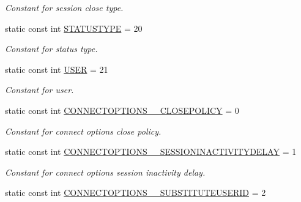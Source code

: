 \begin{DoxyCompactItemize}
\begin{DoxyCompactList}\small\item\em Constant for session close type. \item\end{DoxyCompactList}\item 
\hypertarget{classUMS__Data_1_1UMS__DataPackage_a10e223a94d2f042df21c196f8d7fbebd}{
static const int \hyperlink{classUMS__Data_1_1UMS__DataPackage_a10e223a94d2f042df21c196f8d7fbebd}{STATUSTYPE} = 20}
\label{classUMS__Data_1_1UMS__DataPackage_a10e223a94d2f042df21c196f8d7fbebd}

\begin{DoxyCompactList}\small\item\em Constant for status type. \item\end{DoxyCompactList}\item 
\hypertarget{classUMS__Data_1_1UMS__DataPackage_a41d8c8a7d285aad019d25da3011867f3}{
static const int \hyperlink{classUMS__Data_1_1UMS__DataPackage_a41d8c8a7d285aad019d25da3011867f3}{USER} = 21}
\label{classUMS__Data_1_1UMS__DataPackage_a41d8c8a7d285aad019d25da3011867f3}

\begin{DoxyCompactList}\small\item\em Constant for user. \item\end{DoxyCompactList}\item 
\hypertarget{classUMS__Data_1_1UMS__DataPackage_a63ba2d7a66fe399443d364bd2c99c09c}{
static const int \hyperlink{classUMS__Data_1_1UMS__DataPackage_a63ba2d7a66fe399443d364bd2c99c09c}{CONNECTOPTIONS\_\-\_\-CLOSEPOLICY} = 0}
\label{classUMS__Data_1_1UMS__DataPackage_a63ba2d7a66fe399443d364bd2c99c09c}

\begin{DoxyCompactList}\small\item\em Constant for connect options close policy. \item\end{DoxyCompactList}\item 
\hypertarget{classUMS__Data_1_1UMS__DataPackage_ac3e27be80c79e4927a7bf2cebf378f99}{
static const int \hyperlink{classUMS__Data_1_1UMS__DataPackage_ac3e27be80c79e4927a7bf2cebf378f99}{CONNECTOPTIONS\_\-\_\-SESSIONINACTIVITYDELAY} = 1}
\label{classUMS__Data_1_1UMS__DataPackage_ac3e27be80c79e4927a7bf2cebf378f99}

\begin{DoxyCompactList}\small\item\em Constant for connect options session inactivity delay. \item\end{DoxyCompactList}\item 
\hypertarget{classUMS__Data_1_1UMS__DataPackage_a6a74b65816c324e16d677bfcce5d2de9}{
static const int \hyperlink{classUMS__Data_1_1UMS__DataPackage_a6a74b65816c324e16d677bfcce5d2de9}{CONNECTOPTIONS\_\-\_\-SUBSTITUTEUSERID} = 2}
\label{classUMS__Data_1_1UMS__DataPackage_a6a74b65816c324e16d677bfcce5d2de9}


\end{DoxyCompactItemize}

